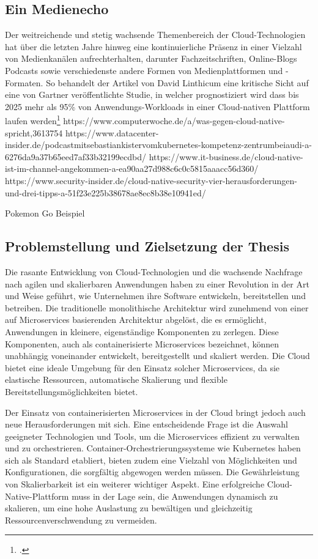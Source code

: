 \subsection{Ein Medienecho}
Der weitreichende und stetig wachsende Themenbereich der Cloud-Technologien hat über die letzten Jahre hinweg eine kontinuierliche Präsenz in einer Vielzahl von Medienkanälen aufrechterhalten, darunter Fachzeitschriften, Online-Blogs Podcasts sowie verschiedenste andere Formen von Medienplattformen und -Formaten. So behandelt der Artikel von David Linthicum eine kritische Sicht auf eine von Gartner veröffentlichte Studie, in welcher prognostiziert wird dass bis 2025 mehr als 95\% von Anwendungs-Workloads in einer Cloud-nativen Plattform laufen werden\footcite{compWoche}
https://www.computerwoche.de/a/was-gegen-cloud-native-spricht,3613754
https://www.datacenter-insider.de/podcastmitsebastiankistervomkubernetes-kompetenz-zentrumbeiaudi-a-6276da9a37b65eed7af33b32199ecdbd/
https://www.it-business.de/cloud-native-ist-im-channel-angekommen-a-ea90aa27d988c6c0c5815aaacc56d360/
https://www.security-insider.de/cloud-native-security-vier-herausforderungen-und-drei-tipps-a-51f23e225b38678ae8ec8b38e10941ed/

Pokemon Go Beispiel
\subsection{Problemstellung und Zielsetzung der Thesis}
Die rasante Entwicklung von Cloud-Technologien und die wachsende Nachfrage nach agilen und skalierbaren Anwendungen haben zu einer Revolution in der Art und Weise geführt, wie Unternehmen ihre Software entwickeln, bereitstellen und betreiben. Die traditionelle monolithische Architektur wird zunehmend von einer auf Microservices basierenden Architektur abgelöst, die es ermöglicht, Anwendungen in kleinere, eigenständige Komponenten zu zerlegen. Diese Komponenten, auch als containerisierte Microservices bezeichnet, können unabhängig voneinander entwickelt, bereitgestellt und skaliert werden. Die Cloud bietet eine ideale Umgebung für den Einsatz solcher Microservices, da sie elastische Ressourcen, automatische Skalierung und flexible Bereitstellungsmöglichkeiten bietet.

Der Einsatz von containerisierten Microservices in der Cloud bringt jedoch auch neue Herausforderungen mit sich. Eine entscheidende Frage ist die Auswahl geeigneter Technologien und Tools, um die Microservices effizient zu verwalten und zu orchestrieren. Container-Orchestrierungssysteme wie Kubernetes haben sich als Standard etabliert, bieten zudem eine Vielzahl von Möglichkeiten und Konfigurationen, die sorgfältig abgewogen werden müssen. Die Gewährleistung von Skalierbarkeit ist ein weiterer wichtiger Aspekt. Eine erfolgreiche Cloud-Native-Plattform muss in der Lage sein, die Anwendungen dynamisch zu skalieren, um eine hohe Auslastung zu bewältigen und gleichzeitig Ressourcenverschwendung zu vermeiden.

